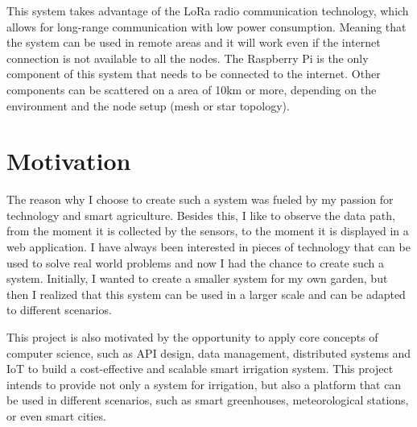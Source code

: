 This system takes advantage of the LoRa radio communication technology, 
which allows for long-range communication with low power consumption. Meaning that the system can be used in remote areas and
it will work even if the internet connection is not available to all the nodes. The Raspberry Pi is the only component of this system
that needs to be connected to the internet. Other components can be scattered on a area of 10km or more, depending on
the environment and the node setup (mesh or star topology).

\newpage
\section{Motivation}

The reason why I choose to create such a system was fueled by my passion for technology and smart agriculture. Besides this,
I like to observe the data path, from the moment it is collected by the sensors, to the moment it is displayed
in a web application. 
I have always been interested in pieces of technology that can be used to solve real world problems and now I had the chance
to create such a system.
Initially, I wanted to create a smaller system for my own garden, but then I realized that this system can be used in a larger
scale and can be adapted to different scenarios.

This project is also motivated by the opportunity to apply core concepts of computer science, such as API design, data management, 
distributed systems and IoT \- to build a cost-effective and scalable smart irrigation system. This project intends to provide
not only a system for irrigation, but also a platform that can be used in different scenarios, such as smart greenhouses,
meteorological stations, or even smart cities.

